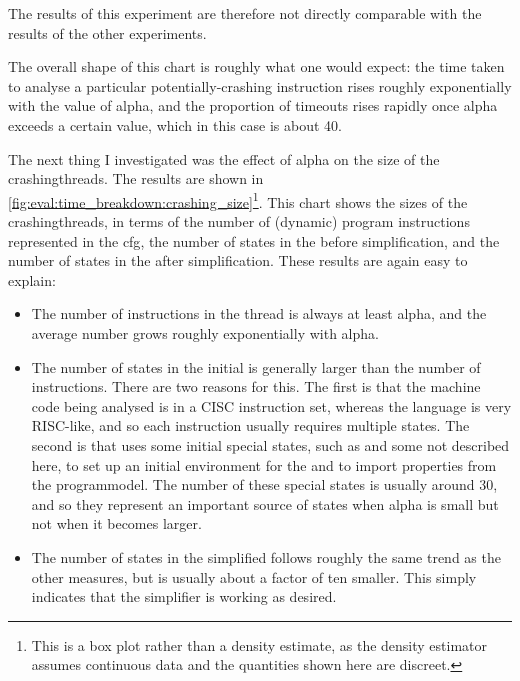 The results of this experiment are therefore not directly comparable
with the results of the other experiments.


The overall shape of this chart is roughly what one would expect: the
time taken to analyse a particular potentially-crashing instruction
rises roughly exponentially with the value of \gls{alpha}, and the
proportion of timeouts rises rapidly once \gls{alpha} exceeds a
certain value, which in this case is about 40.

The next thing I investigated was the effect of \gls{alpha} on the
size of the \glspl{crashingthread}.  The results are shown in
\autoref{fig:eval:time_breakdown:crashing_size}\footnote{This is a box
  plot rather than a density estimate, as the density estimator
  assumes continuous data and the quantities shown here are
  discreet.}.  This chart shows the sizes of the
\glspl{crashingthread}, in terms of the number of (dynamic) program
instructions represented in the \gls{cfg}, the number of states in the
{\StateMachine} before simplification, and the number of states in the
{\StateMachine} after simplification.  These results are again easy to
explain:

\begin{itemize}
\item The number of instructions in the thread is always at least
  \gls{alpha}, and the average number grows roughly exponentially with
  \gls{alpha}.
\item The number of states in the initial {\StateMachine} is generally
  larger than the number of instructions.  There are two reasons for
  this.  The first is that the machine code being analysed is in a
  CISC instruction set, whereas the {\StateMachine} language is very
  RISC-like, and so each instruction usually requires multiple states.
  The second is that {\implementation} uses some initial special
  states, such as  and some not described here,
  to set up an initial environment for the {\StateMachine} and to
  import properties from the \gls{programmodel}.  The number of these
  special states is usually around 30, and so they represent an
  important source of states when \gls{alpha} is small but not when it
  becomes larger.
\item The number of states in the simplified {\StateMachine} follows
  roughly the same trend as the other measures, but is usually about a
  factor of ten smaller.  This simply indicates that the simplifier is
  working as desired.
\end{itemize}

